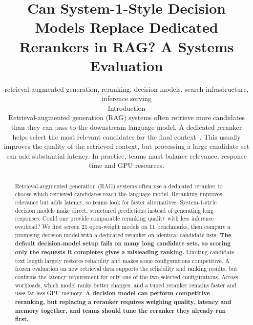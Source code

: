 \documentclass[conference]{IEEEtran}
\begin{document}
\title{Can System-1-Style Decision Models Replace Dedicated Rerankers in RAG? A Systems Evaluation}

\author{

\maketitle

\begin{abstract}
Retrieval-augmented generation (RAG) systems often use a dedicated reranker to choose which retrieved candidates reach the language model. Reranking improves relevance but adds latency, so teams look for faster alternatives. System-1-style decision models make direct, structured predictions instead of generating long responses. Could one provide comparable reranking quality with less inference overhead? We first screen 21 open-weight models on 11 benchmarks, then compare a promising decision model with a dedicated reranker on identical candidate lists. \textbf{The default decision-model setup fails on many long candidate sets, so scoring only the requests it completes gives a misleading ranking.} Limiting candidate text length largely restores reliability and makes some configurations competitive. A frozen evaluation on new retrieval data supports the reliability and ranking results, but confirms the latency requirement for only one of the two selected configurations. Across workloads, which model ranks better changes, and a tuned reranker remains faster and uses far less GPU memory. \textbf{A decision model can perform competitive reranking, but replacing a reranker requires weighing quality, latency and memory together, and teams should tune the reranker they already run first.}
\end{abstract}

\begin{IEEEkeywords}
retrieval-augmented generation, reranking, decision models, search infrastructure, inference serving
\end{IEEEkeywords}

\section{Introduction}
Retrieval-augmented generation (RAG) systems often retrieve more candidates than they can pass to the downstream language model. A dedicated reranker helps select the most relevant candidates for the final context~\cite{robertson2009bm25,lewis2020rag,gao2023ragsurvey,nogueira2019bert}. This usually improves the quality of the retrieved context, but processing a large candidate set can add substantial latency. In practice, teams must balance relevance, response time and GPU resources.

}
\end{document}
